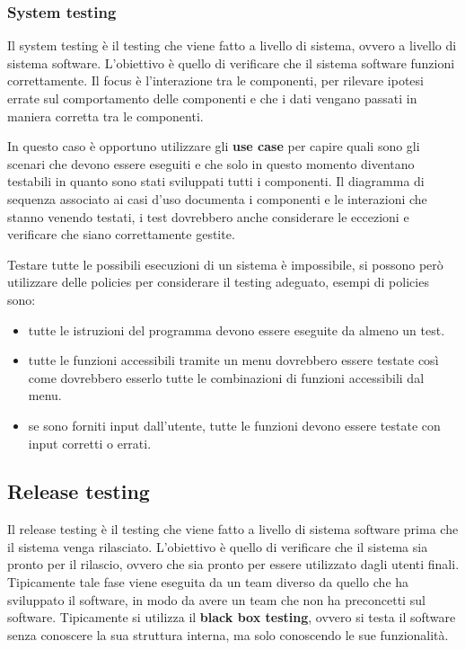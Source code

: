 \subsubsection{System testing}
Il system testing è il testing che viene fatto a livello di sistema, ovvero a livello
di sistema software. L'obiettivo è quello di verificare che il sistema software
funzioni correttamente. Il focus è l'interazione tra le componenti, per rilevare 
ipotesi errate sul comportamento delle componenti e che i dati vengano passati
in maniera corretta tra le componenti.

In questo caso è opportuno utilizzare gli \textbf{use case} per capire quali sono
gli scenari che devono essere eseguiti e che solo in questo momento diventano 
testabili in quanto sono stati sviluppati tutti i componenti.
Il diagramma di sequenza associato ai casi d’uso documenta i componenti e
le interazioni che stanno venendo testati, i test dovrebbero anche considerare
le eccezioni e verificare che siano correttamente gestite.

Testare tutte le possibili esecuzioni di un sistema è impossibile,
si possono però utilizzare delle policies per considerare il testing adeguato,
esempi di policies sono:
\begin{itemize}
    \item tutte le istruzioni del programma
    devono essere eseguite da almeno un test.
    \item tutte le funzioni accessibili tramite un menu dovrebbero
    essere testate così come dovrebbero esserlo tutte le combinazioni di
    funzioni accessibili dal menu.
    \item se sono forniti input dall’utente, tutte le funzioni devono essere
    testate con input corretti o errati.
\end{itemize}
\subsection{Release testing}
Il release testing è il testing che viene fatto a livello di sistema software
prima che il sistema venga rilasciato. L'obiettivo è quello di verificare che
il sistema sia pronto per il rilascio, ovvero che sia pronto per essere utilizzato
dagli utenti finali. 
Tipicamente tale fase viene eseguita da un team diverso da quello che ha sviluppato
il software, in modo da avere un team che non ha preconcetti sul software.
Tipicamente si utilizza il \textbf{black box testing}, ovvero si testa il software
senza conoscere la sua struttura interna, ma solo conoscendo le sue funzionalità.

